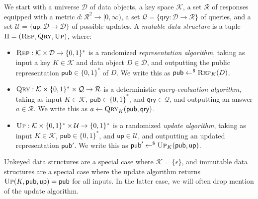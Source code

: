 We start with a universe $\mathcal{D}$ of data objects, a key space $\mathcal{K}$, a set $\mathcal{R}$ of responses equipped with a metric $d: \mathcal{R}^2 \to [0,\infty)$, a set $\mathcal{Q} = \{\mathsf{qry}: \mathcal{D} \to \mathcal{R}\}$ of queries, and a set $\mathcal{U} = \{\mathsf{up}: \mathcal{D} \to \mathcal{D}\}$ of possible updates. A {\em mutable data structure} is a tuple $\Pi = (\textsc{Rep},\textsc{Qry},\textsc{Up})$, where:

\begin{itemize}
  \item $\textsc{Rep}: \mathcal{K} \times \mathcal{D} \to \{0,1\}^*$ is a randomized {\em representation algorithm}, taking as input a key $K \in \mathcal{K}$ and data object $D \in \mathcal{D}$, and outputting the public representation $\mathsf{pub} \in \{0,1\}^*$ of $D$. We write this as $\mathsf{pub} \gets^\$ \textsc{Rep}_K(D)$.
  \item $\textsc{Qry}: \mathcal{K} \times \{0,1\}^* \times \mathcal{Q} \to \mathcal{R}$ is a deterministic {\em query-evaluation algorithm}, taking as input $K \in \mathcal{K}$, $\mathsf{pub} \in \{0,1\}^*$, and $\mathsf{qry} \in \mathcal{Q}$, and outputting an answer $a \in \mathcal{R}$. We write this as $a \gets \textsc{Qry}_K(\mathsf{pub},\mathsf{qry})$.
  \item $\textsc{Up}: \mathcal{K} \times \{0,1\}^* \times \mathcal{U} \to \{0,1\}^*$ is a randomized {\em update algorithm}, taking as input $K \in \mathcal{K}$, $\mathsf{pub} \in \{0,1\}^*$, and $\mathsf{up} \in \mathcal{U}$, and outputting an updated representation $\mathsf{pub}'$. We write this as $\mathsf{pub}' \gets^\$ \textsc{Up}_K(\mathsf{pub},\mathsf{up})$.
\end{itemize}

Unkeyed data structures are a special case where $\mathcal{K} = \{\epsilon\}$, and immutable data structures are a special case where the update algorithm returns $\textsc{Up}(K,\mathsf{pub},\mathsf{up})=\mathsf{pub}$ for all inputs.  In the latter case, we will often drop mention of the update algorithm.

